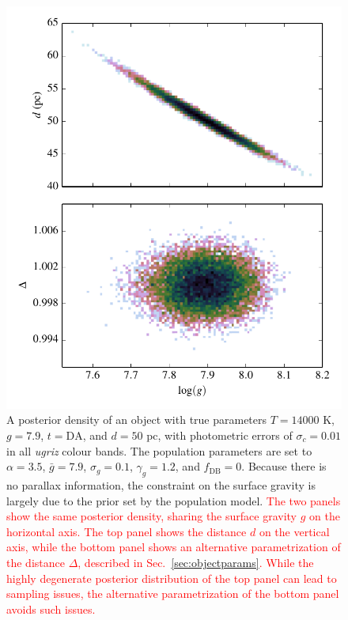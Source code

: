\documentclass[fleqn,usenatbib]{mnras}
\newcommand{\changes}[1]{\textcolor{red}{#1}}
\newcommand{\Teff}{T}
\newcommand{\logg}{g}
\begin{document}
\begin{figure}
	\includegraphics[width=\columnwidth]{banana.pdf}
    \caption{A posterior density of an object with true parameters $\Teff=14000$ K, $\logg=7.9$, $t=\text{DA}$, and $d=50$ pc, with photometric errors of $\sigma_c=0.01$ in all \emph{ugriz} colour bands. The population parameters are set to $\alpha=3.5$, $\bar{g}=7.9$, $\sigma_g=0.1$, $\gamma_g=1.2$, and $f_\text{DB}=0$. Because there is no parallax information, the constraint on the surface gravity is largely due to the prior set by the population model. \changes{The two panels show the same posterior density, sharing the surface gravity $\logg$ on the horizontal axis. The top panel shows the distance $d$ on the vertical axis, while the bottom panel shows an alternative parametrization of the distance $\Delta$, described in Sec.~\ref{sec:objectparams}. While the highly degenerate posterior distribution of the top panel can lead to sampling issues, the alternative parametrization of the bottom panel avoids such issues.}}
    \label{fig:banana}
\end{figure}
\end{document}
